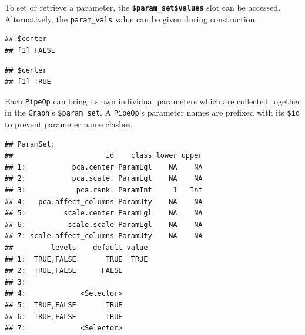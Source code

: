\documentclass[]{article}
\newenvironment{Shaded}{\begin{snugshade}}{\end{snugshade}}
\newcommand{\DataTypeTok}[1]{\textcolor[rgb]{0.13,0.29,0.53}{#1}}
\newcommand{\KeywordTok}[1]{\textcolor[rgb]{0.13,0.29,0.53}{\textbf{#1}}}
\newcommand{\NormalTok}[1]{#1}
\newcommand{\OperatorTok}[1]{\textcolor[rgb]{0.81,0.36,0.00}{\textbf{#1}}}
\newcommand{\OtherTok}[1]{\textcolor[rgb]{0.56,0.35,0.01}{#1}}
\newcommand{\StringTok}[1]{\textcolor[rgb]{0.31,0.60,0.02}{#1}}
\renewenvironment{Shaded} {\begin{snugshade}\small} {\end{snugshade}}
\begin{document}
To set or retrieve a parameter, the \textbf{\texttt{\$param\_set\$values}} slot can be accessed.
Alternatively, the \texttt{param\_vals} value can be given during construction.

\begin{Shaded}
\end{Shaded}

\begin{verbatim}
## $center
## [1] FALSE
\end{verbatim}

\begin{Shaded}
\end{Shaded}

\begin{verbatim}
## $center
## [1] TRUE
\end{verbatim}

Each \texttt{PipeOp} can bring its own individual parameters which are collected together in the \texttt{Graph}'s \texttt{\$param\_set}.
A \texttt{PipeOp}'s parameter names are prefixed with its \texttt{\$id} to prevent parameter name clashes.

\begin{Shaded}
\end{Shaded}

\begin{verbatim}
## ParamSet: 
##                      id    class lower upper
## 1:           pca.center ParamLgl    NA    NA
## 2:           pca.scale. ParamLgl    NA    NA
## 3:            pca.rank. ParamInt     1   Inf
## 4:   pca.affect_columns ParamUty    NA    NA
## 5:         scale.center ParamLgl    NA    NA
## 6:          scale.scale ParamLgl    NA    NA
## 7: scale.affect_columns ParamUty    NA    NA
##         levels    default value
## 1:  TRUE,FALSE       TRUE  TRUE
## 2:  TRUE,FALSE      FALSE      
## 3:                             
## 4:             <Selector>      
## 5:  TRUE,FALSE       TRUE      
## 6:  TRUE,FALSE       TRUE      
## 7:             <Selector>
\end{verbatim}
\end{document}
